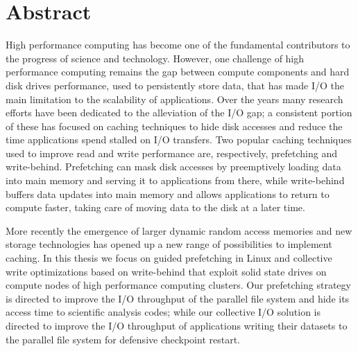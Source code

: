 \documentclass[a4paper,titlepage,oneside,11pt]{book}
\begin{document}

\newpage
\thispagestyle{empty}
\newpage
\thispagestyle{empty}
\null
\newpage
{}\setcounter{page}{1}
\chapter*{Abstract}%
High performance computing has become one of the fundamental contributors to the progress of science and technology. However, one challenge of high performance computing remains 
the gap between compute components and hard disk drives performance, used to persistently store data, that has made I/O the main limitation to the scalability of applications.
Over the years many research efforts have been dedicated to the alleviation of the I/O gap; a consistent portion of these has focused on caching techniques to hide disk accesses 
and reduce the time applications spend stalled on I/O transfers. Two popular caching techniques used to improve read and write performance are, respectively, prefetching and 
write-behind. Prefetching can mask disk accesses by preemptively loading data into main memory and serving it to applications from there, while write-behind buffers data updates 
into main memory and allows applications to return to compute faster, taking care of moving data to the disk at a later time.

More recently the emergence of larger dynamic random access memories and new storage technologies has opened up a new range of possibilities to implement caching. In this thesis 
we focus on guided prefetching in Linux and collective write optimizations based on write-behind that exploit solid state drives on compute nodes of high performance computing clusters.
Our prefetching strategy is directed to improve the I/O throughput of the parallel file system and hide its access time to scientific analysis codes; while our collective I/O solution 
is directed to improve the I/O throughput of applications writing their datasets to the parallel file system for defensive checkpoint restart.
\end{document}
